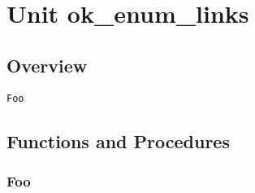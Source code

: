 \documentclass{report}
\begin{document}
\newlength{\tmplength}
\chapter{Unit ok{\_}enum{\_}links}
\section{Overview}
\begin{description}
\item[\texttt{Foo}]
\end{description}
\section{Functions and Procedures}
\subsection*{Foo}
\end{document}
